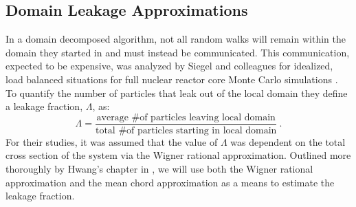 \documentclass[preprint,11pt]{elsarticle}
\begin{document}
\subsection{Domain Leakage Approximations}
\label{subsec:domain_leak_approx}

In a domain decomposed algorithm, not all random walks will remain within the
domain they started in and must instead be communicated. This communication,
expected to be expensive, was analyzed by Siegel and colleagues for idealized,
load balanced situations for full nuclear reactor core Monte Carlo simulations
\cite{siegel_analysis_2012}.  To quantify the number of particles that leak
out of the local domain they define a leakage fraction, $\Lambda$, as:
\begin{equation}
  \Lambda = \frac{\text{average \# of particles leaving local domain}}
          {\text{total \# of particles starting in local domain}}\:.
          \label{eq:leakage_fraction}
\end{equation}
For their studies, it was assumed that the value of $\Lambda$ was dependent on
the total cross section of the system via the Wigner rational
approximation. Outlined more thoroughly by Hwang's chapter in
\cite{azmy_nuclear_2010}, we will use both the Wigner rational approximation
and the mean chord approximation as a means to estimate the leakage fraction.
\end{document}

